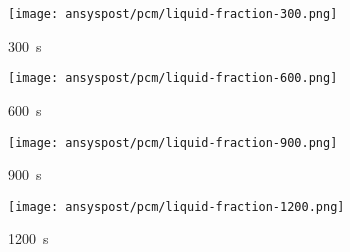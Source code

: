 \begin{figure}[H]
    \centering

    \begin{minipage}[t]{0.485\textwidth}
        \centering
        \setlength{\tabcolsep}{1pt} %
        \begin{subfigure}[t]{0.16\textwidth}
            \centering
        \end{subfigure}%
        \hspace{2mm}%
        \begin{subfigure}[t]{0.2\textwidth}
            \centering
            \texttt{[image: ansyspost/pcm/liquid-fraction-300.png]}
            \caption{\SI{300}{\second}}\label{fig:liquid_fraction_300}
        \end{subfigure}%
        \begin{subfigure}[t]{0.2\textwidth}
            \centering
            \texttt{[image: ansyspost/pcm/liquid-fraction-600.png]}
            \caption{\SI{600}{\second}}\label{fig:liquid_fraction_600}
        \end{subfigure}%
        \begin{subfigure}[t]{0.2\textwidth}
            \centering
            \texttt{[image: ansyspost/pcm/liquid-fraction-900.png]}
            \caption{\SI{900}{\second}}\label{fig:liquid_fraction_900}
        \end{subfigure}%
        \begin{subfigure}[t]{0.2\textwidth}
            \centering
            \texttt{[image: ansyspost/pcm/liquid-fraction-1200.png]}
            \caption{\SI{1200}{\second}}\label{fig:liquid_fraction_1200}
        \end{subfigure}
        \caption{Flüssigkeitsanteil Konturen. Die Legende bezieht sich auf~\ref{fig:liquid_fraction_1200}}
        \label{fig:liquid_frac_kontur}
    \end{minipage}
    \hspace{2mm} %
    \begin{minipage}[t]{0.485\textwidth}
        \centering
        \begin{subfigure}[t]{0.16\textwidth}
            \centering

\end{subfigure}
\end{minipage}
\end{figure}
